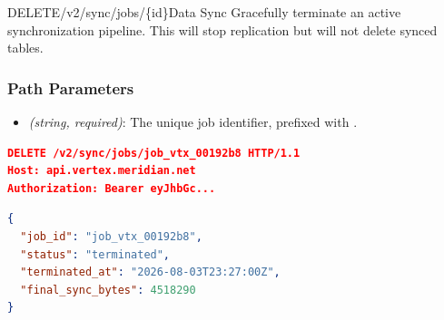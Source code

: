 \par
\vspace{1.5em}

\begin{apiendpoint}{DELETE}{/v2/sync/jobs/\{id\}}{Data Sync}
Gracefully terminate an active synchronization pipeline. This will stop replication but will not delete synced tables.
\end{apiendpoint}

\subsubsection{Path Parameters}
\begin{itemize}
  \item {} \textit{(string, required)}: The unique job identifier, prefixed with .
\end{itemize}

\noindent
\begin{minipage}[t]{0.48\linewidth}
  \begin{tcolorbox}[codeboxstyle, title={Example Request}]
\begin{lstlisting}[language=json,numbers=none]
DELETE /v2/sync/jobs/job_vtx_00192b8 HTTP/1.1
Host: api.vertex.meridian.net
Authorization: Bearer eyJhbGc...
\end{lstlisting}
  \end{tcolorbox}
\end{minipage}
\hfill
\begin{minipage}[t]{0.48\linewidth}
  \begin{tcolorbox}[codeboxstyle, title={Example Response (200 OK)}]
\begin{lstlisting}[language=json]
{
  "job_id": "job_vtx_00192b8",
  "status": "terminated",
  "terminated_at": "2026-08-03T23:27:00Z",
  "final_sync_bytes": 4518290
}
\end{lstlisting}
  \end{tcolorbox}
\end{minipage}
